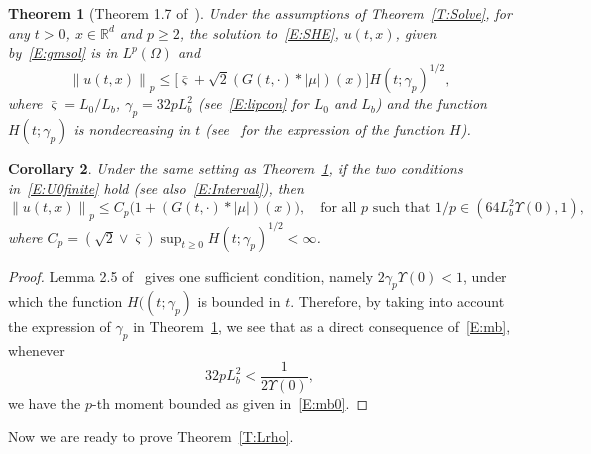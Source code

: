 \documentclass[a4paper,11pt]{article}%
\theoremstyle{plain}
\newtheorem{theorem}{Theorem}[section]
\newtheorem{corollary}[theorem]{Corollary}
\theoremstyle{definition}
\numberwithin{equation}{section}
\newcommand{\R}{\mathbb{R}}
\newcommand{\Norm}[1]{\left\| #1 \right\|}
\begin{document}
\begin{theorem}[Theorem 1.7 of~\cite{chen.huang:19:comparison}]\label{T:ExUn}
  Under the assumptions of Theorem~\ref{T:Solve}, for any $t>0$, $x \in \R^d$ and $p \ge 2$, the
  solution to~\eqref{E:SHE}, $u(t,x)$, given by~\eqref{E:gmsol} is in $L^p (\Omega)$ and
  \begin{equation}\label{E:mb}
    \Norm{u(t,x)}_p \le \big[\bar{\varsigma}+\sqrt{2}(G(t,\cdot) * |\mu|)(x)\big]H(t;\gamma_p)^{1/2},
  \end{equation}
  where $\bar{\varsigma} = L_0/L_b$, $\gamma_p = 32pL_b^2$ (see~\eqref{E:lipcon} for $L_0$ and $L_b$)
  and the function $H(t;\gamma_p)$ is nondecreasing in $t$ (see~\cite{chen.huang:19:comparison} for
  the expression of the function $H$).
\end{theorem}

\begin{corollary}\label{C:Mom}
  Under the same setting as Theorem~\ref{T:ExUn}, if the two conditions in~\eqref{E:U0finite} hold
  (see also~\eqref{E:Interval}), then
  \begin{equation}\label{E:mb0}
    \Norm{u(t,x)}_p \le C_p\bigg(1+ (G(t, \cdot)*|\mu|)(x) \bigg),
    \quad \text{for all $p$ such that $1/p \in \left(64 L_b^2\Upsilon(0),1\right)$},
  \end{equation}
  where $C_p = \left(\sqrt{2}\vee \overline{\varsigma}\right)\sup_{t\ge 0}
  H(t;\gamma_p)^{1/2}<\infty$.
\end{corollary}
\begin{proof}
  Lemma 2.5 of~\cite{chen.kim:19:nonlinear} gives one sufficient condition, namely
  $2\gamma_p\Upsilon(0)<1$, under which the function $H((t;\gamma_p)$ is bounded in $t$. Therefore,
  by taking into account the expression of $\gamma_p$ in Theorem~\ref{T:ExUn}, we see that as a
  direct consequence of~\eqref{E:mb}, whenever
  \begin{equation}\label{E:pLip}
     32 p L_b^2 < \frac{1}{2\Upsilon(0)},
  \end{equation}
  we have the $p$-th moment bounded as given in~\eqref{E:mb0}.
\end{proof}


Now we are ready to prove Theorem~\ref{T:Lrho}.
\end{document}
